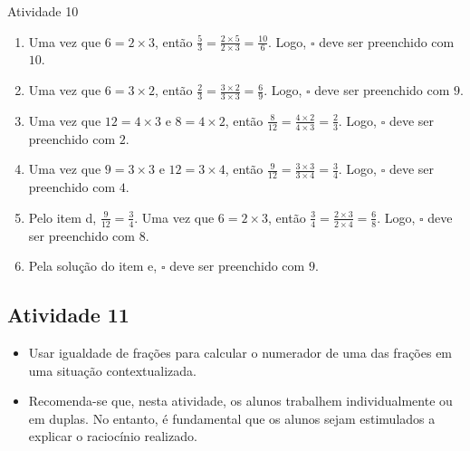 \begin{multicols}{2}
\begin{resposta*}{Atividade 10} 
\begin{enumerate} [\quad a)] %
    \item       Uma vez que       $6 = 2 \times 3$, então       $\frac{5}{3} = 
\frac{2 \times 5}{2 \times 3} = \frac{10}{6}$. Logo,       $\square$       deve 
ser preenchido com       $10$.
    \item       Uma vez que       $6 = 3 \times 2$, então       $\frac{2}{3} = 
\frac{3 \times 2}{3 \times 3} = \frac{6}{9}$. Logo,       $\square$       deve 
ser preenchido com       $9$.
    \item       Uma vez que       $12 = 4 \times 3$       e       $8 = 4 \times 
2$, então       $\frac{8}{12} = \frac{4 \times 2}{4 \times 3} = \frac{2}{3}$. 
Logo,       $\square$       deve ser preenchido com       $2$.
    \item       Uma vez que       $9 = 3 \times 3$       e       $12 = 3 \times 
4$, então       $\frac{9}{12} = \frac{3 \times 3}{3 \times 4} = \frac{3}{4}$. 
Logo,       $\square$       deve ser preenchido com       $4$.
    \item       Pelo item d,       $\frac{9}{12} = \frac{3}{4}$. Uma vez que     
  $6 = 2 \times 3$, então       $\frac{3}{4} = \frac{2 \times 3}{2 \times 4} = 
\frac{6}{8}$. Logo,       $\square$       deve ser preenchido com       $8$.
    \item       Pela solução do item e,       $\square$       deve ser 
preenchido com       $9$.
\end{enumerate} %
  
\end{resposta*}



\subsection{Atividade 11}

\begin{itemize} %
    \item       Usar igualdade de frações para calcular o numerador de uma das 
frações em uma situação contextualizada.
\end{itemize} %
  
 
\begin{itemize} %
    \item       Recomenda-se que, nesta atividade, os alunos trabalhem 
individualmente ou em duplas. No entanto, é fundamental que os alunos sejam 
estimulados a explicar o raciocínio realizado.
\end{itemize} %


\end{multicols}
